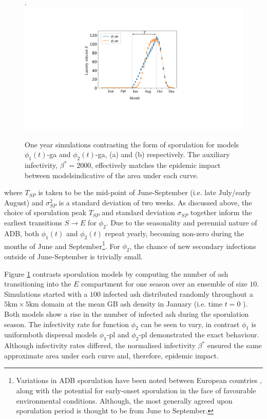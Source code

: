 \begin{figure}.
    \centering
    \includegraphics[scale=0.35]{chapter6/figures/fig5-sporulation.pdf}
    \caption{One year simulations contrasting the form of sporulation for models $\phi_1(t)$-ga and $\phi_2(t)$-ga, (a) and (b) respectively. The auxiliary infectivity, $\beta^*=2000$, effectively matches the epidemic impact between models\textemdash indicative of the area under each curve.}
    \label{fig:SEIR-sporulation}
\end{figure}

where $T_{SP}$ is taken to be the mid-point of June-September (i.e. late July/early August) and $\sigma_{SP}^2$ is a standard deviation of two weeks.
As discussed above, the choice of sporulation peak $T_{SP}$ and standard deviation $\sigma_{SP}$ together inform the earliest transitions $S\rightarrow E$ for $\phi_2$.
Due to the seasonality and perennial nature of ADB, both $\phi_1(t)$ and $\phi_2(t)$ repeat yearly, becoming non-zero during the months of June and September\footnote{Variations in ADB sporulation have been noted between European countries \cite{https://doi.org/10.1111/mpp.12073}, along with the potential for early-onset sporulation in the face of favourable environmental conditions. Although, the most generally agreed upon sporulation period is thought to be from June to September.}.
For $\phi_2$, the chance of new secondary infections outside of June-September is trivially small.

Figure \ref{fig:SEIR-sporulation} contrasts sporulation models by computing the number of ash transitioning into the $E$ compartment for one season over an ensemble of size $10$.
Simulations started with a $100$ infected ash distributed randomly throughout a $\mathrm{5km \times 5km}$ domain at the mean GB ash density in January (i.e. time $t=0$ ).
Both models show a rise in the number of infected ash during the sporulation season.
The infectivity rate for function $\phi_2$ can be seen to vary, in contrast $\phi_1$ is uniform\textemdash both dispersal models $\phi_1$-pl and $\phi_2$-pl demonstrated the exact behaviour.
Although infectivity rates differed, the normalised infectivity $\beta^*$ ensured the same approximate area under each curve and, therefore, epidemic impact.

